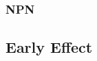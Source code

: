 \documentclass[a4paper, fontsize=8pt, landscape, DIV=1]{scrartcl}
\begin{document}
\begin{multicols*}{4}
    \subsubsection{NPN}

    \subsection{Early Effect}
    
    \subsection{}
    \subsection{}




\end{multicols*}

\setcounter{secnumdepth}{2}
\end{document}
